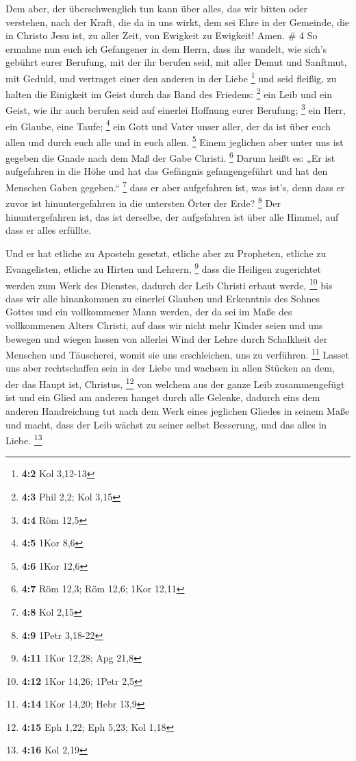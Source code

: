  Dem aber, der überschwenglich tun kann über alles, das wir
bitten oder verstehen, nach der Kraft, die da in uns wirkt,
 dem sei Ehre in der Gemeinde, die in Christo Jesu ist, zu
aller Zeit, von Ewigkeit zu Ewigkeit! Amen. \# 4  So ermahne
nun euch ich Gefangener in dem Herrn, dass ihr wandelt, wie sich's
gebührt eurer Berufung, mit der ihr berufen seid,  mit aller
Demut und Sanftmut, mit Geduld, und vertraget einer den anderen in der
Liebe \footnote{\textbf{4:2} Kol 3,12-13}  und seid fleißig,
zu halten die Einigkeit im Geist durch das Band des Friedens:
\footnote{\textbf{4:3} Phil 2,2; Kol 3,15}  ein Leib und ein
Geist, wie ihr auch berufen seid auf einerlei Hoffnung eurer Berufung;
\footnote{\textbf{4:4} Röm 12,5}  ein Herr, ein Glaube, eine
Taufe; \footnote{\textbf{4:5} 1Kor 8,6}  ein Gott und Vater
unser aller, der da ist über euch allen und durch euch alle und in euch
allen. \footnote{\textbf{4:6} 1Kor 12,6}  Einem jeglichen
aber unter uns ist gegeben die Gnade nach dem Maß der Gabe Christi.
\footnote{\textbf{4:7} Röm 12,3; Röm 12,6; 1Kor 12,11} 
Darum heißt es: „Er ist aufgefahren in die Höhe und hat das Gefängnis
gefangengeführt und hat den Menschen Gaben gegeben.`` \footnote{\textbf{4:8}
  Kol 2,15}  dass er aber aufgefahren ist, was ist's, denn
dass er zuvor ist hinuntergefahren in die untersten Örter der Erde?
\footnote{\textbf{4:9} 1Petr 3,18-22}  Der hinuntergefahren
ist, das ist derselbe, der aufgefahren ist über alle Himmel, auf dass er
alles erfüllte.

 Und er hat etliche zu Aposteln gesetzt, etliche aber zu
Propheten, etliche zu Evangelisten, etliche zu Hirten und Lehrern,
\footnote{\textbf{4:11} 1Kor 12,28; Apg 21,8}  dass die
Heiligen zugerichtet werden zum Werk des Dienstes, dadurch der Leib
Christi erbaut werde, \footnote{\textbf{4:12} 1Kor 14,26; 1Petr 2,5}
 bis dass wir alle hinankommen zu einerlei Glauben und
Erkenntnis des Sohnes Gottes und ein vollkommener Mann werden, der da
sei im Maße des vollkommenen Alters Christi,  auf dass wir
nicht mehr Kinder seien und uns bewegen und wiegen lassen von allerlei
Wind der Lehre durch Schalkheit der Menschen und Täuscherei, womit sie
uns erschleichen, uns zu verführen. \footnote{\textbf{4:14} 1Kor 14,20;
  Hebr 13,9}  Lasset uns aber rechtschaffen sein in der
Liebe und wachsen in allen Stücken an dem, der das Haupt ist, Christus,
\footnote{\textbf{4:15} Eph 1,22; Eph 5,23; Kol 1,18}  von
welchem aus der ganze Leib zusammengefügt ist und ein Glied am anderen
hanget durch alle Gelenke, dadurch eins dem anderen Handreichung tut
nach dem Werk eines jeglichen Gliedes in seinem Maße und macht, dass der
Leib wächst zu seiner selbst Besserung, und das alles in Liebe.
\footnote{\textbf{4:16} Kol 2,19}

